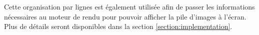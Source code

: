 {{{			Cette organisation par lignes est également utilisée afin de passer les informations nécessaires au moteur de rendu pour pouvoir afficher la pile d'images à l'écran. Plus de détails seront disponibles dans la section \ref{section:implementation}.


		 }
	}
}

